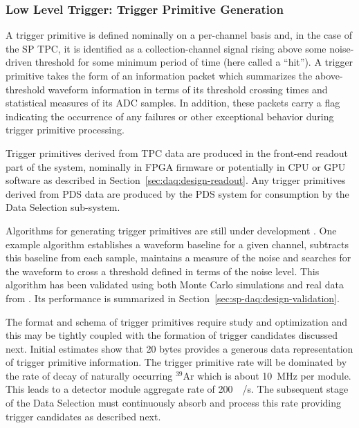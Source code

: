 \subsubsection{Low Level Trigger: Trigger Primitive Generation}
\label{sec:sp-daq:design-trigger-primitives}

A trigger primitive is defined nominally on a per-channel basis and, in the case of
the SP TPC, it is identified as a collection-channel signal rising above some
noise-driven threshold for some minimum period of time (here called a
``hit'').
A trigger primitive takes the form of an information packet which
summarizes the above-threshold waveform information in terms of its
threshold crossing times and statistical measures of its ADC samples. 
In addition, these packets carry a flag indicating the occurrence of any
failures or other exceptional behavior during trigger primitive processing.

Trigger primitives derived from TPC data
are produced in the front-end readout part of the  system,
nominally in FPGA firmware or potentially in CPU or GPU software as described in
Section~\ref{sec:daq:design-readout}.
Any trigger primitives derived from PDS data are produced by the PDS system
for consumption by the  Data Selection sub-system.

Algorithms for generating trigger primitives are still under development
\cite{docid-11275}. 
One example algorithm\cite{docid-11236} establishes a waveform baseline
for a given channel, subtracts this baseline from each sample, maintains
a measure of the noise and searches for the waveform to cross a
threshold defined in terms of the noise level.
This algorithm has been validated using both Monte Carlo simulations and
real data from . 
Its performance is summarized in
Section~\ref{sec:sp-daq:design-validation}.

The format and schema of trigger primitives require study and
optimization and this may be tightly coupled with the formation of
trigger candidates discussed next. 
Initial estimates show that 20 bytes provides a generous data
representation of trigger primitive information. 
The trigger primitive rate will be dominated by the rate of decay of naturally occurring
$^{39}$Ar which is about \SI{10}{\mega\hertz} per module.
This leads to a detector module aggregate rate of
\SI{200}{\mega\byte/\second}.
The subsequent stage of the Data Selection must continuously absorb and process this
rate providing trigger candidates as described next.

